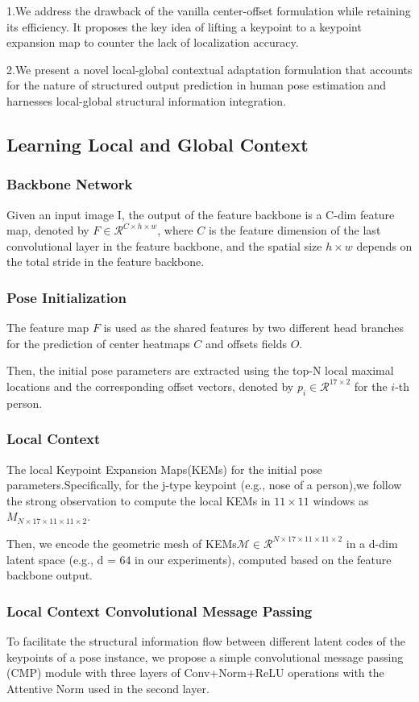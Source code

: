 \documentclass[11pt]{article}
\begin{document}
1.We address the drawback of the vanilla center-offset formulation while retaining its efficiency. It proposes the key idea of lifting a keypoint to a keypoint expansion map to counter the lack of localization accuracy.

2.We present a novel local-global contextual adaptation formulation that accounts for the nature of structured output prediction in human pose estimation and harnesses local-global structural information integration.
\subsection{Learning Local and Global Context}
\subsubsection{Backbone Network}
Given an input image I, the output of the feature backbone is a C-dim feature map, denoted by $F\in \mathcal{R}^{C\times h\times w}$, where $C$ is the feature dimension of the last convolutional layer in the feature backbone, and the spatial size $h\times w$ depends on the total stride in the feature backbone.
\subsubsection{Pose Initialization}
The feature map $F$ is used as the shared features by two different head branches for the prediction of center heatmaps $C$ and offsets fields $O$.

Then, the initial pose parameters are extracted using the top-N local maximal locations and the corresponding offset vectors, denoted by $p_i \in \mathcal{R}^{17\times 2}$ for the $i$-th person.
\subsubsection{Local Context}
The local Keypoint Expansion Maps(KEMs) for the initial pose parameters.Specifically, for the j-type keypoint (e.g., nose of a person),we follow the strong observation to compute the local KEMs in $11 \times 11$ windows as $M_{N\times17\times11\times11\times2}$.
	
Then, we encode the geometric mesh of KEMs$ \mathcal{M} \in \mathcal{R}^{N\times17\times11\times11\times2}$ in a d-dim latent space (e.g., d = 64 in our experiments), computed based on the feature backbone output.
\subsubsection{Local Context Convolutional Message Passing}
To facilitate the structural information flow between different latent codes of the keypoints of a pose instance, we propose a simple convolutional message passing (CMP) module with three layers of Conv+Norm+ReLU operations with the Attentive Norm used in the second layer. 
	
\end{document}
